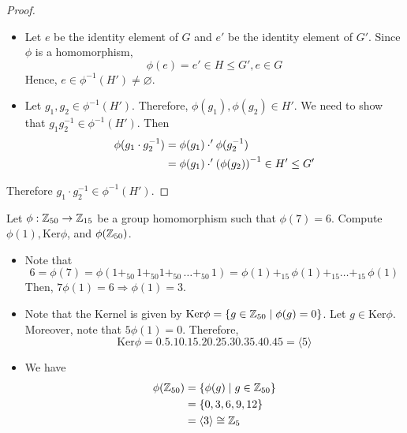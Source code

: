 \begin{proof} \phantom{blank} 
    \begin{itemize} 
        \item     Let $e$ be the identity element of $G$ and $e'$ be the identity element of $G'$. Since $\phi$ is a homomorphism,
        \[ \phi(e) = e' \in H \leq G', e \in G \]
        Hence, $e \in \phi^{-1}(H') \neq \varnothing$.
        \item Let $g_1, g_2 \in \phi^{-1} (H')$. Therefore, $\phi(g_1), \phi(g_2) \in H'$. We need to show that $g_1 g_2^{-1} \in \phi^{-1} (H')$. Then
        \begin{align*}
            \phi(g_1 \cdot g_2^{-1}) &= \phi(g_1) \cdot' \phi(g_2^{-1}) \\
            &= \phi(g_1) \cdot' \qty(\phi(g_2))^{-1} \in H' \leq G'
        \end{align*}
    \end{itemize}
    Therefore $g_1 \cdot g_2^{-1} \in \phi^{-1}(H')$. \qedsymbol
\end{proof}


\begin{exercise}
    Let $\phi: \mathbb{Z}_{50} \to \mathbb{Z}_{15}$ be a group homomorphism such that $\phi(7) = 6$. Compute $\phi(1), \text{Ker} \phi$, and $\phi(\mathbb{Z}_{50})$.
\end{exercise}

\begin{solution} \phantom{blank}
    \begin{itemize}
        \item   Note that 
            \[ 6 = \phi(7) = \phi(1 +_{50} \, 1  +_{50} 1  +_{50} \, \ldots +_{50} \, 1 ) = \phi(1) +_{15} \, \phi(1) +_{15} \ldots +_{15} \, \phi(1) \]
            Then, $7 \phi(1) = 6 \Rightarrow \phi(1) = 3$.
        \item Note that the Kernel is given by $\text{Ker} \phi = \qty{g \in \mathbb{Z}_{50} \mid \phi(g) = 0}$. Let $g \in \text{Ker} \phi$. Moreover, note that $5\phi(1) = 0$. Therefore,
        \[ \text{Ker} \phi = \qty{0, 5, 10, 15, 20, 25, 30, 35, 40,45} = \langle 5 \rangle \]
        \item  We have
        \begin{align*}
            \phi(\mathbb{Z}_{50}) &= \qty{\phi(g) \mid g \in \mathbb{Z}_{50}} \\
            &= \qty{0, 3, 6, 9, 12} \\
            &= \langle 3 \rangle \cong \mathbb{Z}_5
        \end{align*}
    \end{itemize}
\end{solution}

